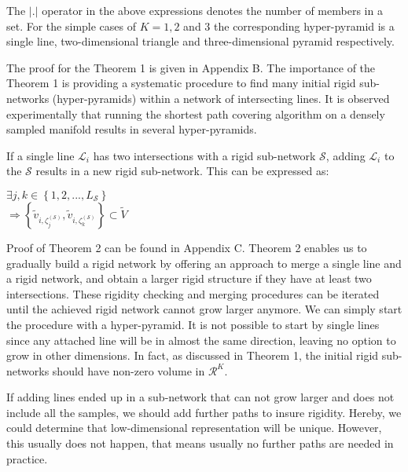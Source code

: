 \documentclass[10pt,journal,cspaper,compsoc]{IEEEtran}
\begin{document}
The $|.|$ operator in the above expressions denotes the number of members in a set. For the simple cases of $K=1,2$ and $3$ the corresponding hyper-pyramid is a single line, two-dimensional triangle and three-dimensional pyramid respectively.

The proof for the Theorem 1 is given in Appendix B. The importance of the Theorem 1 is providing a systematic procedure to find many initial rigid sub-networks (hyper-pyramids) within a network of intersecting lines. It is observed experimentally that running the shortest path covering algorithm on a densely sampled manifold results in several hyper-pyramids.
	
\begin{framed}
\begin{myTheorem}
If a single line $\mathcal{L}_i$ has two intersections with a rigid sub-network $\mathcal{S}$, adding $\mathcal{L}_i$ to the $\mathcal{S}$ results in a new rigid sub-network. This can be expressed as:
\begin{center}
$\exists j,k\in \left\{1,2,...,L_{\mathcal{S}}\right\}$\\
\vspace{1mm}
$\Rightarrow \left\{\tilde{v}_{i,\zeta_j^{(\mathcal{S})}},\tilde{v}_{i,\zeta_k^{(\mathcal{S})}}\right\}\subset\tilde{V}$
\end{center}
\end{myTheorem}
\end{framed}

Proof of Theorem 2 can be found in Appendix C. Theorem 2 enables us to gradually build a rigid network by offering an approach to merge a single line and a rigid network, and obtain a larger rigid structure if they have at least two intersections. These rigidity checking and merging procedures can be iterated until the achieved rigid network cannot grow larger anymore. We can simply start the procedure with a hyper-pyramid. It is not possible to start by single lines since any attached line will be in almost the same direction, leaving no option to grow in other dimensions. In fact, as discussed in Theorem 1, the initial rigid sub-networks should have non-zero volume in $\mathcal{R}^K$.

If adding lines ended up in a sub-network that can not grow larger and does not include all the samples, we should add further paths to insure rigidity. Hereby, we could determine that low-dimensional representation will be unique. However, this usually does not happen, that means usually no further paths are needed in practice.
\end{document}
